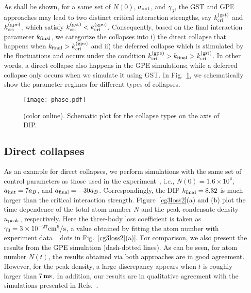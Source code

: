 \documentclass[pra,twocolumn,preprintnumbers,superscriptaddress,longbibliography,showkeys]{revtex4-1}
\begin{document}
As shall be shown, for a same set of $N(0)$, $a_{\rm init}$, and $\gamma_3$, the GST and GPE approaches may lead to two distinct critical interaction strengths, say $k_{\rm cri}^{\rm (gst)}$ and $k_{\rm cri}^{\rm (gpe)}$, which satisfy $k_{\rm cri}^{\rm (gst)}<k_{\rm cri}^{\rm (gpe)}$. Consequently, based on the final interaction parameter $k_{\rm final}$, we categorize the collapses into i) the direct collapse that happens when $k_{\rm final}>k_{\rm cri}^{\rm (gpe)}$ and ii) the deferred collapse which is stimulated by the fluctuations and occurs under the condition $k_{\rm cri}^{\rm (gpe)}>k_{\rm final}>k_{\rm cri}^{\rm (gst)}$. In other words, a direct collapse also happens in the GPE simulations; while a deferred collapse only occurs when we simulate it using GST. In Fig.~\ref{phase}, we schematically show the parameter regimes for different types of collapses.

\begin{figure}[ptb]
\centering
\texttt{[image: phase.pdf]}
\caption{(color online). Schematic plot for the collapse types on the axis of DIP.}
\label{phase}
\end{figure}

\subsection{Direct collapses}

As an example for direct collapses, we perform simulations with the same set of control parameters as those used in the experiment~\cite{CllRb2}, i.e., $N(0)=1.6\times 10^4$, $a_{\rm init}=7a_B$, and $a_{\rm final}=-30 a_{B}$. Correspondingly, the DIP $k_{\rm final}=8.32$ is much larger than the critical interaction strength. Figure~\ref{cg3loss2}(a) and (b) plot the time dependence of the total atom number $N$ and the peak condensate density $n_{\rm peak}$, respectively. Here the three-body loss coefficient is taken as $\gamma_{3} = 3 \times 10^{-27} {\rm cm}^{6} / {\rm s}$, a value obtained by fitting the atom number with experiment data~\cite{CllRb2} [dots in Fig.~\ref{cg3loss2}(a)]. For comparison, we also present the results from the GPE simulation (dash-dotted lines). As can be seen, for atom number $N(t)$, the results obtained via both approaches are in good agreement. However, for the peak density, a large discrepancy appears when $t$ is roughly larger than $7\,{\rm ms}$. In addition, our results are in qualitative agreement with the simulations presented in Refs.~\cite{Ueda1,Ueda2}.
\end{document}

